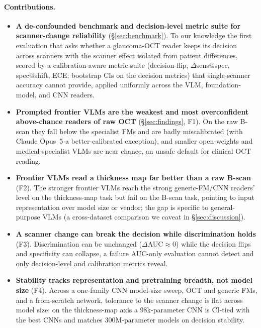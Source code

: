 \paragraph{Contributions.}
\begin{itemize}[leftmargin=1.2em, itemsep=1pt, topsep=1pt]
\item \textbf{A de-confounded benchmark and decision-level metric suite for scanner-change reliability}
  (\S\ref{sec:benchmark}). To our knowledge the first evaluation that asks whether a glaucoma-OCT reader keeps its
  decision across scanners with the scanner effect isolated from patient differences, scored by a calibration-aware
  metric suite (decision-flip, $\Delta$sens@spec, spec@shift, ECE; bootstrap CIs on the decision metrics) that
  single-scanner accuracy cannot provide, applied uniformly across the VLM, foundation-model, and CNN readers.
\item \textbf{Prompted frontier VLMs are the weakest and most overconfident above-chance readers of raw OCT} (\S\ref{sec:findings},
  F1). On the raw B-scan they fall below the specialist FMs and are badly miscalibrated (with Claude Opus~5 a
  better-calibrated exception), and smaller open-weights and medical-specialist VLMs are near chance, an unsafe
  default for clinical OCT reading.
\item \textbf{Frontier VLMs read a thickness map far better than a raw B-scan} (F2). The stronger frontier VLMs reach
  the strong generic-FM/CNN readers' level on the thickness-map task but fail on the B-scan task, pointing to input
  representation over model size or vendor; the gap is specific to general-purpose VLMs (a cross-dataset comparison we
  caveat in \S\ref{sec:discussion}).
\item \textbf{A scanner change can break the decision while discrimination holds} (F3). Discrimination can be
  unchanged ($\Delta$AUC$\approx$0) while the decision flips and specificity can collapse, a failure AUC-only
  evaluation cannot detect and only decision-level and calibration metrics reveal.
\item \textbf{Stability tracks representation and pretraining breadth, not model size} (F4). Across a one-family CNN
  model-size sweep, OCT and generic FMs, and a from-scratch network, tolerance to the scanner change is flat across
  model size: on the thickness-map axis a 98k-parameter CNN is CI-tied with the best CNNs and matches 300M-parameter models on
  decision stability.
\end{itemize}

